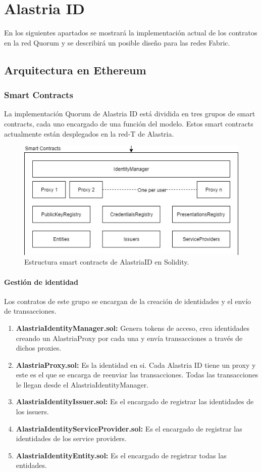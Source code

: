 \chapter{Alastria ID}
En los siguientes apartados se mostrará la implementación actual de los contratos en la red Quorum y se describirá un posible diseño para las redes Fabric.
\section{Arquitectura en Ethereum}
\subsection{Smart Contracts}
La implementación Quorum de Alastria ID está dividida en tres grupos de smart contracts, cada uno encargado de una función del modelo. Estos smart contracts actualmente están desplegados en la red-T de Alastria.
\begin{figure}[H]
\centerline{\includegraphics[scale=1]{recursos/alastriaid-sc.png}}
\caption{Estructura smart contracts de AlastriaID en Solidity.}
\label{sc-alastriaeth}
\end{figure}
\subsubsection{Gestión de identidad}
Los contratos de este grupo se encargan de la creación de identidades y el envío de transacciones.
\begin{enumerate}
    \item \textbf{AlastriaIdentityManager.sol:} Genera tokens de acceso, crea identidades creando un AlastriaProxy por cada una y envía transacciones a través de dichos proxies.
    \item \textbf{AlastriaProxy.sol:} Es la identidad en si. Cada Alastria ID tiene un proxy y este es el que se encarga de reenviar las transacciones. Todas las transacciones le llegan desde el AlastriaIdentityManager.
    \item \textbf{AlastriaIdentityIssuer.sol:} Es el encargado de registrar las identidades de los issuers.
    \item \textbf{AlastriaIdentityServiceProvider.sol:} Es el encargado de registrar las identidades de los service providers.
    \item \textbf{AlastriaIdentityEntity.sol:} Es el encargado de registrar todas las entidades.
\end{enumerate}

